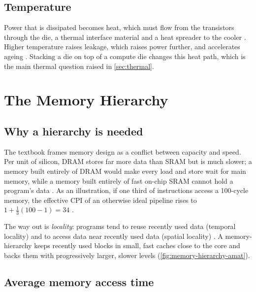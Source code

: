 \subsection{Temperature}
Power that is dissipated becomes heat, which must flow from the transistors through the die, a thermal interface material and a heat spreader to the cooler \cite[sec.~10.10.1]{sarangi2025basic}. Higher temperature raises leakage, which raises power further, and accelerates ageing \cite[sec.~10.10.1]{sarangi2025basic}. Stacking a die on top of a compute die changes this heat path, which is the main thermal question raised in \cref{sec:thermal}.


\section{The Memory Hierarchy}
\label{sec:memory-hierarchy}

\subsection{Why a hierarchy is needed}

The textbook frames memory design as a conflict between capacity and speed. Per unit of silicon, DRAM stores far more data than SRAM but is much slower; a memory built entirely of DRAM would make every load and store wait for main memory, while a memory built entirely of fast on-chip SRAM cannot hold a program's data \cite[sec.~11.1.1]{sarangi2025basic}. As an illustration, if one third of instructions access a 100-cycle memory, the effective CPI of an otherwise ideal pipeline rises to $1 + \tfrac{1}{3}(100-1) = 34$ \cite[sec.~11.1.1]{sarangi2025basic}.

The way out is \emph{locality}: programs tend to reuse recently used data (temporal locality) and to access data near recently used data (spatial locality) \cite[sec.~11.1.2--11.1.6]{sarangi2025basic}. A \gls{memory-hierarchy} keeps recently used blocks in small, fast caches close to the core and backs them with progressively larger, slower levels (\cref{fig:memory-hierarchy-amat}).



\subsection{Average memory access time}
\label{sec:amat}

